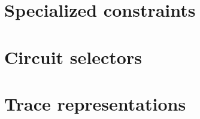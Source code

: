 \section{Specialized constraints}         \label{bls: specialized constraints}         
\section{Circuit selectors}               \label{bls: circuit selectors}               
\section{Trace representations}           \label{bls: trace representations}           
